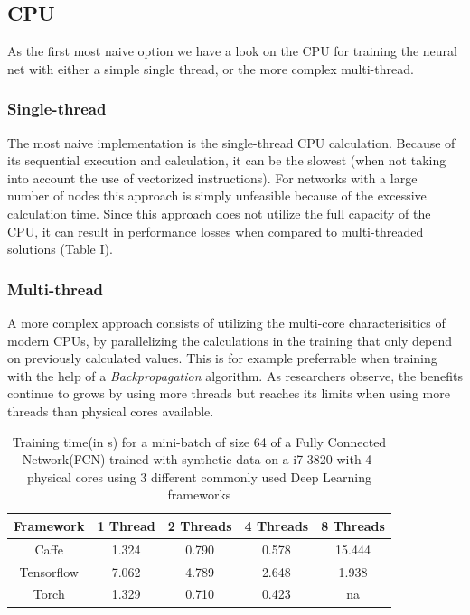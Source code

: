 \documentclass[conference]{IEEEtran}
\begin{document}
\subsection{CPU}
As the first most naive option we have a look on the CPU for training the neural net with either a simple single thread, or the more complex multi-thread.


\subsubsection{Single-thread}
The most naive implementation is the single-thread CPU calculation. Because of its sequential execution and calculation, it can be the slowest (when not taking into account the use of vectorized instructions). For networks with a large number of nodes this approach is simply unfeasible because of the excessive calculation time. Since this approach does not utilize the full capacity of the CPU, it can result in performance losses when compared to multi-threaded solutions (Table I).


\subsubsection{Multi-thread}
A more complex approach consists of utilizing the multi-core characterisitics of modern CPUs, by parallelizing the calculations in the training that only depend on previously calculated values. This is for example preferrable when training with the help of a \emph{Backpropagation} algorithm. As researchers observe, the benefits continue to grows by using more threads but reaches its limits when using more threads than physical cores available.

\begin{table} 
\centering
\begin{tabular}{c c c c c}
\hline
Framework & 1 Thread & 2 Threads &4 Threads & 8 Threads\\\hline
Caffe & 1.324 & 0.790 & 0.578 & 15.444 \\
Tensorflow & 7.062 & 4.789 & 2.648 & 1.938 \\
Torch & 1.329 & 0.710 & 0.423 & na \\\hline
\end{tabular}
\caption{Training time(in s) for a mini-batch of size 64 of a Fully Connected Network(FCN) trained with synthetic data on a i7-3820 with 4-physical cores using 3 different commonly used Deep Learning frameworks\cite{shi2016benchmarking}}
\label{fig_ttfcn}
\end{table}
\end{document}
